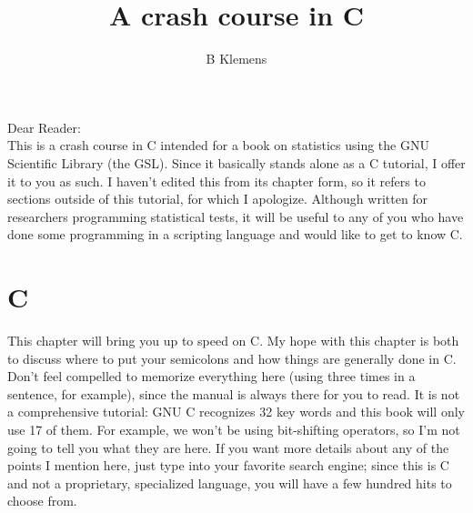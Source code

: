 \documentclass[12pt]{article}
\begin{document}
	\title{A crash course in C}
	\author{B Klemens}
	\maketitle


Dear Reader:\\
This is a crash course in C intended for a book on statistics using the
GNU Scientific Library (the GSL).  Since it basically stands alone as a
C tutorial, I offer it to you as such. I haven't edited this from
its chapter form, so it refers to sections outside of this tutorial,
for which I apologize. Although written for researchers programming
statistical tests, it will be useful to any of you who have done some
programming in a scripting language and would like to get to know C.

\vskip 1cm

\section{C}
\fi


\long{}



This chapter will bring you up to speed on C.  
My hope with this chapter is both to discuss where to put your semicolons
and how things are generally done in C. Don't feel compelled to memorize
everything here (using  three times in a sentence, for
example), since the manual is always there for you to read.  It is not
a comprehensive tutorial: GNU C recognizes 32 key words and this book
will only use 17 of them. For example, we won't be using bit-shifting
operators, so I'm not going to tell you what they are here.  If you want
more details about any of the points I mention here, just type  into your favorite search engine; since this is C and not a
proprietary, specialized language, you will have a few hundred hits to
choose from. 
\end{document}
